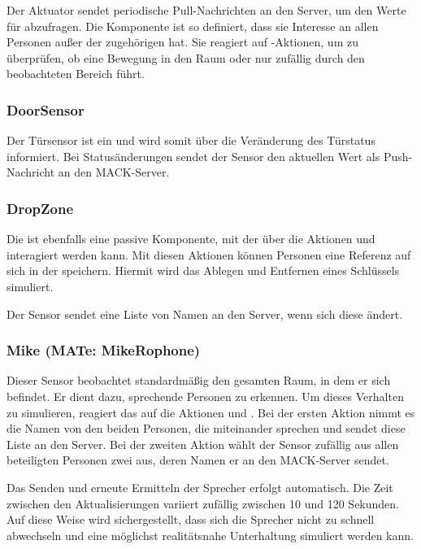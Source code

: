 Der Aktuator sendet periodische Pull-Nachrichten an den Server, um den Werte für  abzufragen. Die Komponente ist so definiert, dass sie Interesse an allen Personen außer der zugehörigen hat. Sie reagiert auf -Aktionen, um zu überprüfen, ob eine Bewegung in den Raum oder nur zufällig durch den beobachteten Bereich führt.

\subsubsection{DoorSensor}
Der Türsensor ist ein  und wird somit über die Veränderung des Türstatus informiert. Bei Statusänderungen sendet der Sensor den aktuellen Wert als Push-Nachricht an den MACK-Server.

\subsubsection{DropZone}
Die  ist ebenfalls eine passive Komponente, mit der über die Aktionen  und  interagiert werden kann. Mit diesen Aktionen können Personen eine Referenz auf sich in der  speichern. Hiermit wird das Ablegen und Entfernen eines Schlüssels simuliert.

Der Sensor sendet eine Liste von Namen an den Server, wenn sich diese ändert.

\subsubsection{Mike (MATe: MikeRophone)}
Dieser Sensor beobachtet standardmäßig den gesamten Raum, in dem er sich befindet. Er dient dazu, sprechende Personen zu erkennen. Um dieses Verhalten zu simulieren, reagiert das  auf die Aktionen  und . Bei der ersten Aktion nimmt es die Namen von den beiden Personen, die miteinander sprechen und sendet diese Liste an den Server. Bei der zweiten Aktion wählt der Sensor zufällig aus allen beteiligten Personen zwei aus, deren Namen er an den MACK-Server sendet. 

Das Senden und erneute Ermitteln der Sprecher erfolgt automatisch. Die Zeit zwischen den Aktualisierungen variiert zufällig zwischen 10 und 120 Sekunden. Auf diese Weise wird sichergestellt, dass sich die Sprecher nicht zu schnell abwechseln und eine möglichst realitätsnahe Unterhaltung simuliert werden kann.
%
%
%

